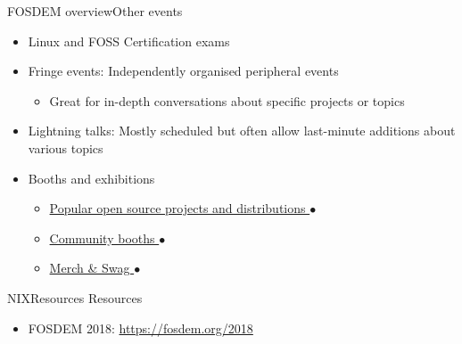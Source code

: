 \documentclass[10pt]{beamer}
\begin{document}
\begin{frame}{FOSDEM overview}{Other events}
    \begin{itemize}
        \item Linux and FOSS Certification exams
        \item Fringe events: Independently organised peripheral events
            \begin{itemize}
                \item Great for in-depth conversations about specific projects or topics
            \end{itemize}
        \item Lightning talks: Mostly scheduled but often allow last-minute additions about various topics
        \item Booths and exhibitions
        \begin{itemize}
            \item \href{run:./photos/stickers.jpg}{Popular open source projects and distributions $\bullet$}
            \item \href{run:./photos/booths.jpg}{Community booths $\bullet$}
            \item \href{run:./photos/merch.jpg}{Merch \& Swag $\bullet$}
        \end{itemize}
    \end{itemize}
\end{frame}

\begin{frame}{NIX}{Resources}
    Resources

    \begin{itemize}
        \item FOSDEM 2018: \url{https://fosdem.org/2018}
    \end{itemize}
\end{frame}
\end{document}
